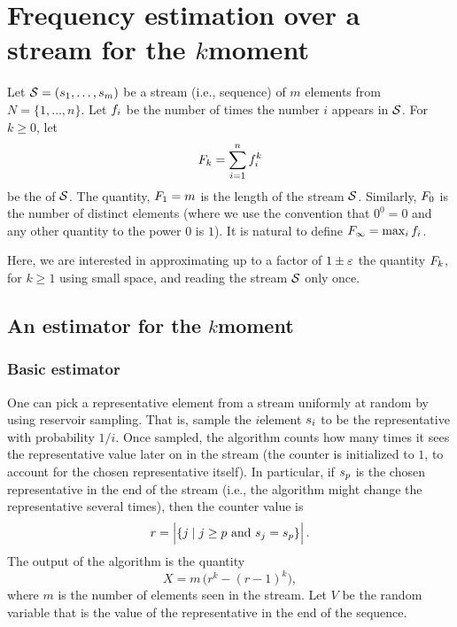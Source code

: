 \section{Frequency estimation over a stream for the %
   $k$\th moment}



Let $\mathcal{S} = ({s}_1, \ldots, {s}_m)$ be a stream (i.e., sequence)
of $m$ elements from $N = \{1,\ldots, n\}$. Let $f_i$ be the number
of times the number $i$ appears in $\mathcal{S}$. For $k \geq 0$, let
\begin{equation*}
    F_k=\sum_{i=1}^n f_i^k
\end{equation*}
be the  of $\mathcal{S}$. The quantity,
$F_1=m$ is the length of the stream $\mathcal{S}$. Similarly, $F_0$ is
the number of distinct elements (where we use the convention that
$0^0=0$ and any other quantity to the power $0$ is $1$). It is natural
to define $F_\infty = \max_i f_i$.

Here, we are interested in approximating up to a factor of $1\pm {\varepsilon}$
the quantity $F_k$, for $k\geq 1$ using small space, and reading
the stream $\mathcal{S}$ only once.

\subsection{An estimator for the $k$\th moment}

\subsubsection{Basic estimator}

One can pick a representative element from a stream uniformly at
random by using reservoir sampling. That is, sample the $i$\th element
${s}_i$ to be the representative with probability $1/i$. Once
sampled, the algorithm counts how many times it sees the representative
value later on in the stream (the counter is initialized to $1$, to
account for the chosen representative itself). In particular, if
${s}_p$ is the chosen representative in the end of the stream (i.e.,
the algorithm might change the representative several times), then the
counter value is
\begin{equation*}
    r = \left| { \left\{ j \;\middle\vert\; j \geq p \text{ and } {s}_j = {s}_p \right\}\Bigr.} \right|.
\end{equation*}
The output of the algorithm is the quantity
\begin{equation*}
    X = m\, \bigl( r^k - (r-1)^k \bigr),
\end{equation*}
where $m$ is the number of elements seen in the stream.  Let $V$ be
the random variable that is the value of the representative in the end
of the sequence.

